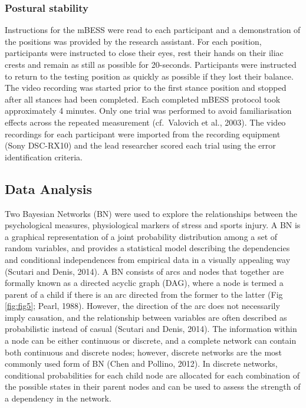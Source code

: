 \documentclass[utf8]{frontiersHLTH}
\begin{document}
\hypertarget{postural-stability-1}{%
\subsubsection*{Postural stability}\label{postural-stability-1}}

Instructions for the mBESS were read to each participant and a
demonstration of the positions was provided by the research assistant.
For each position, participants were instructed to close their eyes,
rest their hands on their iliac crests and remain as still as possible
for 20-seconds. Participants were instructed to return to the testing
position as quickly as possible if they lost their balance. The video
recording was started prior to the first stance position and stopped
after all stances had been completed. Each completed mBESS protocol took
approximately 4 minutes. Only one trial was performed to avoid
familiarisation effects across the repeated measurement (cf.~Valovich et
al., 2003). The video recordings for each participant were imported from
the recording equipment (Sony DSC-RX10) and the lead researcher scored
each trial using the error identification criteria.

\hypertarget{data-analysis}{%
\subsection*{Data Analysis}\label{data-analysis}}

Two Bayesian Networks (BN) were used to explore the relationships
between the psychological measures, physiological markers of stress and
sports injury. A BN is a graphical representation of a joint probability
distribution among a set of random variables, and provides a statistical
model describing the dependencies and conditional independences from
empirical data in a visually appealing way (Scutari and Denis, 2014). A
BN consists of arcs and nodes that together are formally known as a
directed acyclic graph (DAG), where a node is termed a parent of a child
if there is an arc directed from the former to the latter (Fig
\ref{fig:fig5}; Pearl, 1988). However, the direction of the arc does not
necessarily imply causation, and the relationship between variables are
often described as probabilistic instead of casual (Scutari and Denis,
2014). The information within a node can be either continuous or
discrete, and a complete network can contain both continuous and
discrete nodes; however, discrete networks are the most commonly used
form of BN (Chen and Pollino, 2012). In discrete networks, conditional
probabilities for each child node are allocated for each combination of
the possible states in their parent nodes and can be used to assess the
strength of a dependency in the network.
\end{document}
